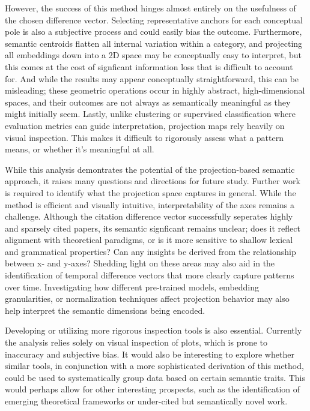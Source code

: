 However, the success of this method hinges almost entirely on the usefulness of the chosen difference vector. Selecting representative anchors for each conceptual pole is also a subjective process and could easily bias the outcome. Furthermore, semantic centroids flatten all internal variation within a category, and projecting all embeddings down into a 2D space may be conceptually easy to interpret, but this comes at the cost of signficant information loss that is difficult to account for. And while the results may appear conceptually straightforward, this can be misleading; these geometric operations occur in highly abstract, high-dimensional spaces, and their outcomes are not always as semantically meaningful as they might initially seem. Lastly, unlike clustering or supervised classification where evaluation metrics can guide interpretation, projection maps rely heavily on visual inspection. This makes it difficult to rigorously assess what a pattern means, or whether it’s meaningful at all.


While this analysis demontrates the potential of the projection-based semantic approach, it raises many questions and directions for future study. Further work is required to identify what the projection space captures in general. While the method is efficient and visually intuitive, interpretability of the axes remains a challenge. Although the citation difference vector successfully seperates highly and sparsely cited papers, its semantic signficant remains unclear; does it reflect alignment with theoretical paradigms, or is it more sensitive to shallow lexical and grammatical properties? Can any insights be derived from the relationship between x- and y-axes? Shedding light on these areas may also aid in the identification of temporal difference vectors that more clearly capture patterns over time. Investigating how different pre-trained models, embedding granularities, or normalization techniques affect projection behavior may also help interpret the semantic dimensions being encoded.


Developing or utilizing more rigorous inspection tools is also essential. Currently the analysis relies solely on visual inspection of plots, which is prone to inaccuracy and subjective bias. It would also be interesting to explore whether similar tools, in conjunction with a more sophisticated derivation of this method, could be used to systematically group data based on certain semantic traits. This would perhaps allow for other interesting prospects, such as the identification of emerging theoretical frameworks or under-cited but semantically novel work.